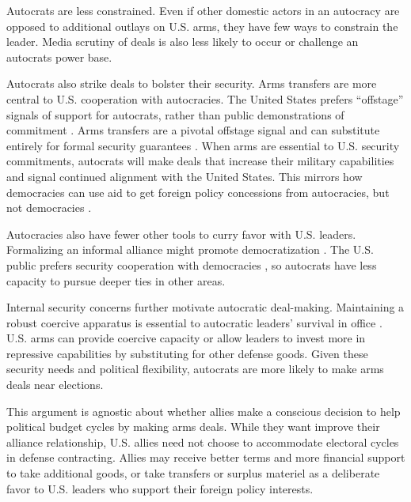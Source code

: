 \documentclass[12pt]{article}
\begin{document}
Autocrats are less constrained.
Even if other domestic actors in an autocracy are opposed to additional outlays on U.S. arms, they have few ways to constrain the leader.%
Media scrutiny of deals is also less likely to occur or challenge an autocrats power base. 


Autocrats also strike deals to bolster their security.
Arms transfers are more central to U.S. cooperation with autocracies.  
The United States prefers ``offstage'' signals of support for autocrats, rather than public demonstrations of commitment \citep{McManusYarhi-Milo2017}.
Arms transfers are a pivotal offstage signal and can substitute entirely for formal security guarantees \citep{Yarhi-Miloetal2016}. 
When arms are essential to U.S. security commitments, autocrats will make deals that increase their military capabilities and signal continued alignment with the United States.
This mirrors how democracies can use aid to get foreign policy concessions from autocracies, but not democracies \citep{BDMSmith2009}.


Autocracies also have fewer other tools to curry favor with U.S. leaders.
Formalizing an informal alliance might promote democratization \citep{GiblerWolford2006}.
The U.S. public prefers security cooperation with democracies \citep{Alley2022}, so autocrats have less capacity to pursue deeper ties in other areas. 

Internal security concerns further motivate autocratic deal-making. 
Maintaining a robust coercive apparatus is essential to autocratic leaders' survival in office \citep{Boix2008}. 
U.S. arms can provide coercive capacity or allow leaders to invest more in repressive capabilities by substituting for other defense goods. 
Given these security needs and political flexibility, autocrats are more likely to make arms deals near elections.



This argument is agnostic about whether allies make a conscious decision to help political budget cycles by making arms deals.
While they want improve their alliance relationship, U.S. allies need not choose to accommodate electoral cycles in defense contracting.
Allies may receive better terms and more financial support to take additional goods, or take transfers or surplus materiel as a deliberate favor to U.S. leaders who support their foreign policy interests. 
\end{document}
